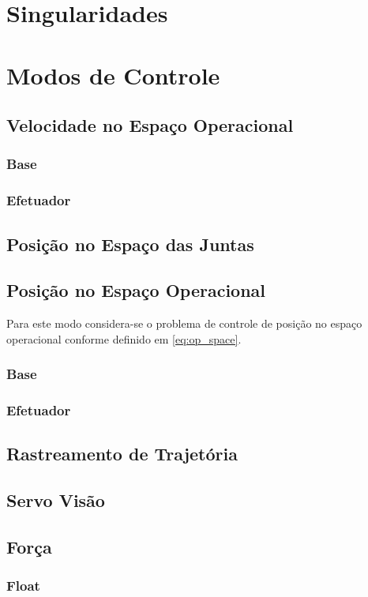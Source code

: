 \section{Singularidades}

\section{Modos de Controle}

\subsection{Velocidade no Espaço Operacional}
\subsubsection{Base}
\subsubsection{Efetuador}
\subsection{Posição no Espaço das Juntas}
\subsection{Posição no Espaço Operacional}
Para este modo considera-se o problema de controle de posição no espaço operacional conforme definido em \ref{eq:op_space}. 

\subsubsection{Base}
\subsubsection{Efetuador}

\subsection{Rastreamento de Trajetória}
\subsection{Servo Visão}
\subsection{Força}
\subsubsection{Float}
